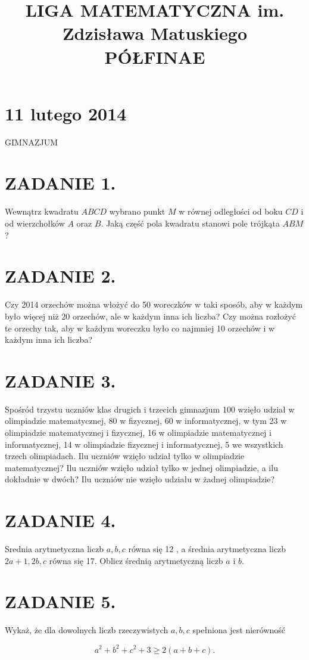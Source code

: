 \documentclass[10pt]{article}
\title{LIGA MATEMATYCZNA im. Zdzisława Matuskiego \\
 PÓŁFINAE }
\author{}
\date{}
\begin{document}
\maketitle
\section*{11 lutego 2014}
GIMNAZJUM

\section*{ZADANIE 1.}
Wewnątrz kwadratu \(A B C D\) wybrano punkt \(M\) w równej odległości od boku \(C D\) i od wierzchołków \(A\) oraz \(B\). Jaką część pola kwadratu stanowi pole trójkąta \(A B M\) ?

\section*{ZADANIE 2.}
Czy 2014 orzechów można włożyć do 50 woreczków w taki sposób, aby w każdym było więcej niż 20 orzechów, ale w każdym inna ich liczba? Czy można rozłożyć te orzechy tak, aby w każdym woreczku było co najmniej 10 orzechów i w każdym inna ich liczba?

\section*{ZADANIE 3.}
Spośród trzystu uczniów klas drugich i trzecich gimnazjum 100 wzięło udział w olimpiadzie matematycznej, 80 w fizycznej, 60 w informatycznej, w tym 23 w olimpiadzie matematycznej i fizycznej, 16 w olimpiadzie matematycznej i informatycznej, 14 w olimpiadzie fizycznej i informatycznej, 5 we wszystkich trzech olimpiadach. Ilu uczniów wzięło udział tylko w olimpiadzie matematycznej? Ilu uczniów wzięło udział tylko w jednej olimpiadzie, a ilu dokładnie w dwóch? Ilu uczniów nie wzięło udziału w żadnej olimpiadzie?

\section*{ZADANIE 4.}
Srednia arytmetyczna liczb \(a, b, c\) równa się 12 , a średnia arytmetyczna liczb \(2 a+1,2 b, c\) równa się 17. Oblicz średnią arytmetyczną liczb \(a\) i \(b\).

\section*{ZADANIE 5.}
Wykaż, że dla dowolnych liczb rzeczywistych \(a, b, c\) spełniona jest nierówność

\[
a^{2}+b^{2}+c^{2}+3 \geqslant 2(a+b+c) .
\]
\end{document}
